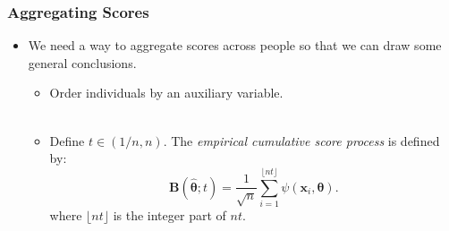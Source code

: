 \documentclass{beamer}
\begin{document}


\begin{frame}[fragile]
  \frametitle{Aggregating Scores}
  \begin{itemize}
    \item We need a way to aggregate scores across people so that we
      can draw some general conclusions.
      \begin{itemize}
        \item Order individuals by an auxiliary variable.\\ \ \\
        \item Define $t \in (1/n, n)$.
          The {\em empirical cumulative score process} is defined by:\\
  \begin{equation*}
    \bm{B}(\hat{\bm{\theta}}; t) = \frac{1}{\sqrt{n}}
    \displaystyle\sum_{i=1}^{\lfloor nt 
      \rfloor} \psi ({\bm{x}}_i, \bm{\theta}).
    \end{equation*}
  where $\lfloor nt \rfloor$ is the integer part of $nt$.
      \end{itemize}
  \end{itemize}
\end{frame}
\end{document}

